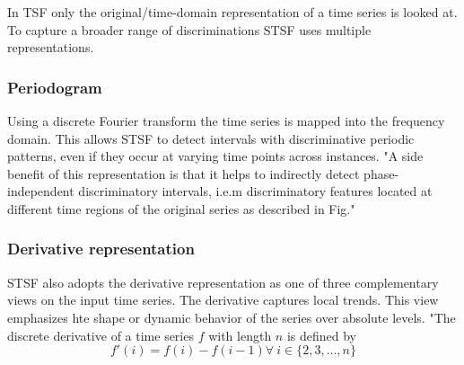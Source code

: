 
In TSF only the original/time-domain representation of a time series is looked at.
To capture a broader range of discriminations STSF uses multiple representations.
\subsubsection*{Periodogram}
Using a discrete Fourier transform the time series is mapped into the 
frequency domain. This allows STSF to detect intervals with discriminative periodic patterns,
even if they occur at varying time points across instances. "A side benefit of this 
representation is that it helps to indirectly detect phase-independent discriminatory intervals, i.e.m
discriminatory features located at different time regions of the original series as described in 
Fig." %

\subsubsection*{Derivative representation}
STSF also adopts the derivative representation as one of three complementary views 
on the input time series. The derivative captures local trends. This view emphasizes hte shape or dynamic behavior of the 
series over absolute levels. "The
discrete derivative of a time series $f$ with length $n$ is defined by
\[
	f'(i) = f(i) - f(i - 1) \forall ~ i \in \{2,3, \dots, n\}
\] %

